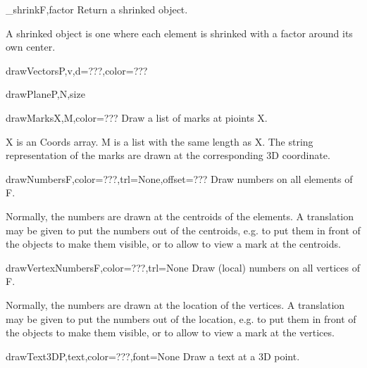 \begin{funcdesc}{_shrink}{F,factor}
Return a shrinked object.

    A shrinked object is one where each element is shrinked with a factor
    around its own center.
    

\end{funcdesc}


\begin{funcdesc}{drawVectors}{P,v,d=???,color=???}


\end{funcdesc}


\begin{funcdesc}{drawPlane}{P,N,size}


\end{funcdesc}


\begin{funcdesc}{drawMarks}{X,M,color=???}
Draw a list of marks at pioints X.

    X is an Coords array.
    M is a list with the same length as X.
    The string representation of the marks are drawn at the corresponding
    3D coordinate.
    

\end{funcdesc}


\begin{funcdesc}{drawNumbers}{F,color=???,trl=None,offset=???}
Draw numbers on all elements of F.

    Normally, the numbers are drawn at the centroids of the elements.
    A translation may be given to put the numbers out of the centroids,
    e.g. to put them in front of the objects to make them visible,
    or to allow to view a mark at the centroids.
    

\end{funcdesc}


\begin{funcdesc}{drawVertexNumbers}{F,color=???,trl=None}
Draw (local) numbers on all vertices of F.

    Normally, the numbers are drawn at the location of the vertices.
    A translation may be given to put the numbers out of the location,
    e.g. to put them in front of the objects to make them visible,
    or to allow to view a mark at the vertices.
    

\end{funcdesc}


\begin{funcdesc}{drawText3D}{P,text,color=???,font=None}
Draw a text at a 3D point.

\end{funcdesc}


